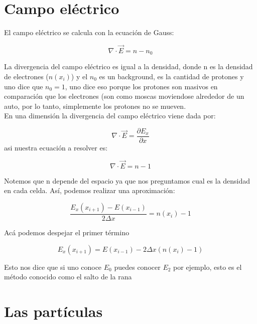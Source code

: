 \documentclass[11pt]{article}
\begin{document}
\section{Campo eléctrico}

El campo eléctrico se calcula con la ecuación de Gauss:

\begin{equation*}
    \nabla \cdot \overrightarrow{E} = n-n_0
\end{equation*}

La divergencia del campo eléctrico es igual a la densidad, donde n es la densidad de electrones ($n(x_i)$) y el $n_0$ es un background, es la cantidad de protones y uno dice que $n_0=1$, uno dice eso porque los protones son masivos en comparación que los electrones (son como moscas moviendose alrededor de un auto, por lo tanto, simplemente los protones no se mueven.\\

    En una dimensión la divergencia del campo eléctrico viene dada por:
    
\begin{equation*}
    \nabla \cdot \overrightarrow{E} = \frac{\partial E_x}{\partial x}
\end{equation*}
asi nuestra ecuación a resolver es:

\begin{equation*}
    \nabla \cdot \overrightarrow{E} = n - 1
\end{equation*}

Notemos que n depende del espacio ya que nos preguntamos cual es la densidad en cada celda. Así, podemos realizar una aproximación:

\begin{equation*}
    \frac{E_x(x_{i+1})-E(x_{i-1})}{2\Delta x} = n(x_i)-1 %
\end{equation*}

Acá podemos despejar el primer término

\begin{equation*}
    E_x(x_{i+1}) = E(x_{i-1}) - 2\Delta x(n(x_i)-1)
\end{equation*}

Esto nos dice que si uno conoce $E_0$ puedes conocer $E_2$ por ejemplo, esto es el método conocido como el salto de la rana

\section{Las partículas}
\end{document}
